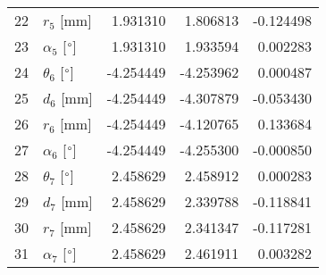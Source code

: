 \documentclass{standalone}%
\begin{document}
\begin{tabular}{llrrr}
22 &              $r_{5}$ [mm] &  1.931310 &   1.806813 &  -0.124498 \\
23 &  $\alpha_{5}$ [$\degree$] &  1.931310 &   1.933594 &   0.002283 \\
24 &  $\theta_{6}$ [$\degree$] & -4.254449 &  -4.253962 &   0.000487 \\
25 &              $d_{6}$ [mm] & -4.254449 &  -4.307879 &  -0.053430 \\
26 &              $r_{6}$ [mm] & -4.254449 &  -4.120765 &   0.133684 \\
27 &  $\alpha_{6}$ [$\degree$] & -4.254449 &  -4.255300 &  -0.000850 \\
28 &  $\theta_{7}$ [$\degree$] &  2.458629 &   2.458912 &   0.000283 \\
29 &              $d_{7}$ [mm] &  2.458629 &   2.339788 &  -0.118841 \\
30 &              $r_{7}$ [mm] &  2.458629 &   2.341347 &  -0.117281 \\
31 &  $\alpha_{7}$ [$\degree$] &  2.458629 &   2.461911 &   0.003282 \\
\bottomrule
\end{tabular}
%
\end{document}
